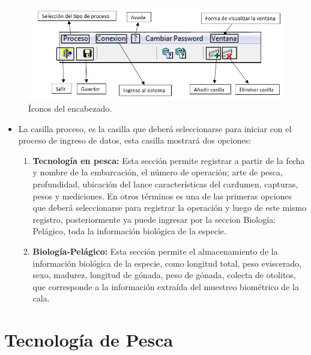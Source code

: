 \documentclass[a4paper,oneside,11pt]{book}
\begin{document}
  \begin{figure} [!h]
  \begin{center}
  \includegraphics[scale=0.8]{imagen_manual_OPEMAR/presentacion.png}
   \caption{Íconos del encabezado.}
  \end{center}
   \end{figure}
 
 
 \newpage
 
 \begin{itemize}
 
 \item  La casilla proceso, es la casilla que deberá seleccionarse para iniciar con el proceso de ingreso de datos, esta casilla mostrará dos opciones:
  
\begin{enumerate}
 \item \textbf{Tecnología en pesca:} Esta sección permite registrar a partir de la fecha y nombre de la embarcación, el número de operación; arte de pesca, profundidad, ubicación del lance características del cardumen, capturas, pesos y mediciones. En otros términos es una de las primeras opciones que deberá seleccionarse para registrar la operación y luego de este mismo registro, posteriormente ya puede ingresar por la seccion Biología: Pelágico, toda la información biológica de la especie.
 
\item \textbf{Biología-Pelágico:} Esta sección permite el almacenamiento de la información biológica de la especie, como longitud total, peso eviscerado, sexo, madurez, longitud de gónada, peso de gónada, colecta de otolitos, que corresponde a la información extraída del muestreo biométrico de la cala. 
 \end{enumerate}
 \end{itemize}



\section{Tecnología de Pesca}
\end{document}
